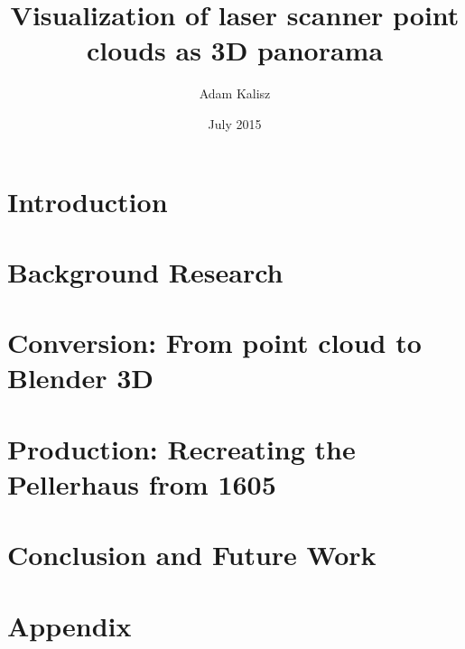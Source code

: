 \documentclass[12pt, twoside, titlepage]{book}
\title{Visualization of laser scanner point clouds as 3D panorama}
\author{Adam Kalisz}
\date{July 2015}
\begin{document}
	
	
	
	\thispagestyle{empty}
	
	
	
	

	\pagestyle{plain}
	\tableofcontents
	
	
	\listoffigures
	\clearpage
	
	\listoftables
	\clearpage
	

	\thispagestyle{plain}
	
	\pagestyle{fancy}
	\chapter{Introduction}
	
	\chapter{Background Research}
	
	\chapter{Conversion: From point cloud to Blender 3D}
	
	\chapter{Production: Recreating the Pellerhaus from 1605}
	
	\chapter{Conclusion and Future Work}
		
	
	
	\appendix
	\chapter{Appendix}
	
	
	\pagestyle{plain}
	\printbibliography
		
\end{document}
